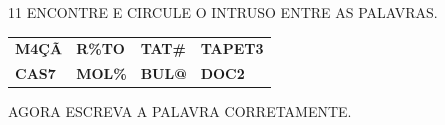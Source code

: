 



\num{11} ENCONTRE E CIRCULE O INTRUSO ENTRE AS PALAVRAS.

\begin{longtable}[]{@{}llll@{}}
\toprule
\textbf{M4ÇÃ} & \textbf{R\%TO} & \textbf{TAT\#} &
\textbf{TAPET3}\tabularnewline
\textbf{CAS7} & \textbf{MOL\%} & \textbf{BUL@} &
\textbf{DOC2}\tabularnewline
\bottomrule
\end{longtable}

AGORA ESCREVA A PALAVRA CORRETAMENTE.


